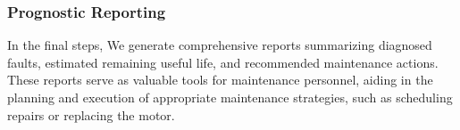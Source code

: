 \subsubsection{Prognostic Reporting} In the final steps, We generate comprehensive reports summarizing diagnosed faults, estimated remaining useful life, and recommended maintenance actions. These reports serve as valuable tools for maintenance personnel, aiding in the planning and execution of appropriate maintenance strategies, such as scheduling repairs or replacing the motor.